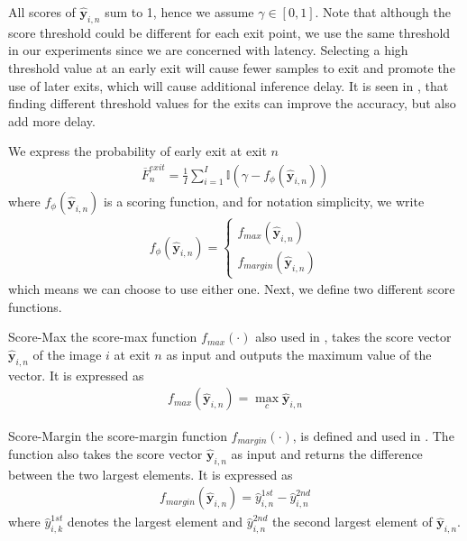 \begin{enumdescript}
	All scores of  $ \bm{\hat{y}}_{i,n} $ sum to 1, hence we assume $	\gamma \in \left[0,1\right] $. Note that although the score threshold could be different for each exit point, we use the same threshold in our experiments since we are concerned with latency. Selecting a high threshold value at an early exit will cause fewer samples to exit and promote the use of later exits, which will cause additional inference delay. It is seen in \cite{teerapittayanon_finding_2018}, that finding different threshold values for the exits can improve the accuracy, but also add more delay.
	
	We express the probability of early exit at exit $ n $		\begin{align}
	\overline{F}^{exit}_n = \frac{1}{I}\sum_{i=1}^{I} \mathbb{I} \left(\gamma-f_{\phi}\left(\bm{\hat{y}}_{i,n}\right) \right)
	\end{align}
	where $ f_\phi\left(\bm{\hat{y}}_{i,n}\right) $ is a scoring function, and for notation simplicity, we write 
	\begin{align}
	f_{\phi}\left(\bm{\hat{y}}_{i,n}\right) = \begin{cases}
	f_{max}\left(\bm{\hat{y}}_{i,n}\right)\\
	f_{margin}\left(\bm{\hat{y}}_{i,n}\right)
	\end{cases}
	\end{align}
	which means we can choose to use either one. Next, we define two different score functions.
	
	\begin{enumdescript}
		\item[Score-Max] the score-max function $ f_{max}(\cdot)$ also used in \cite{leroux_resource-constrained_2015}, takes the score vector $ \bm{\hat{y}}_{i,n} $ of the image $ i $ at exit $ n $ as input and outputs the maximum value of the vector. It is expressed as
		\begin{align}
		f_{max}\left(\bm{\hat{y}}_{i,n}\right) = \underset{c}{\max} \bm{\hat{y}}_{i,n}
		\end{align}
		\item[Score-Margin] the score-margin function $ f_{margin}(\cdot)$, is defined and used in \cite{park_big/little_2015}. The function also takes the score vector $ \bm{\hat{y}}_{i,n} $ as input and returns the difference between the two largest elements. It is expressed as
		\begin{align}
		f_{margin}\left(\bm{\hat{y}}_{i,n}\right) = \hat{y}_{i,n}^{1st} - \hat{y}_{i,n}^{2nd} \label{eq:f_margin}
		\end{align}
		where $ \hat{y}_{i,k}^{1st} $ denotes the largest element and $ \hat{y}_{i,n}^{2nd} $ the second largest element of $ \bm{\hat{y}}_{i,n} $.
		

\end{enumdescript}
\end{enumdescript}
